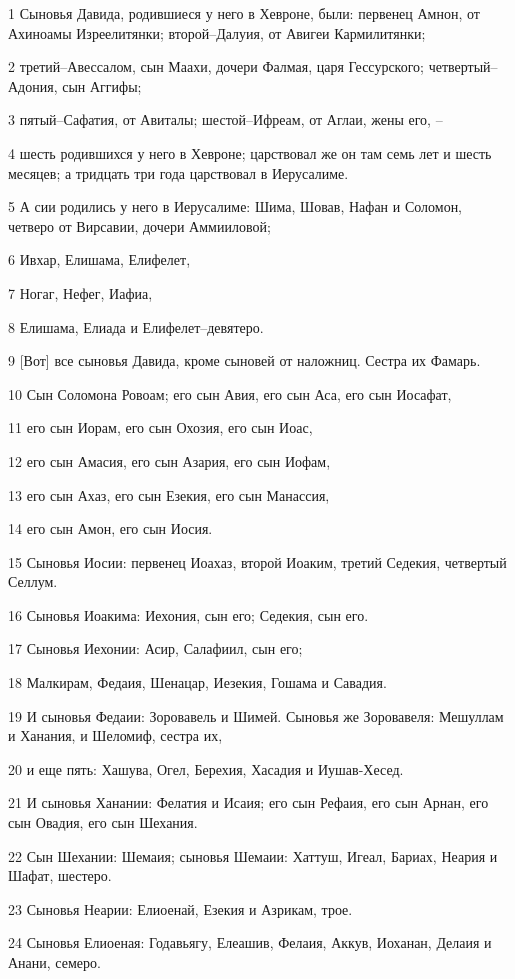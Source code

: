 \par 1 Сыновья Давида, родившиеся у него в Хевроне, были: первенец Амнон, от Ахиноамы Изреелитянки; второй--Далуия, от Авигеи Кармилитянки;
\par 2 третий--Авессалом, сын Маахи, дочери Фалмая, царя Гессурского; четвертый--Адония, сын Аггифы;
\par 3 пятый--Сафатия, от Авиталы; шестой--Ифреам, от Аглаи, жены его, --
\par 4 шесть родившихся у него в Хевроне; царствовал же он там семь лет и шесть месяцев; а тридцать три года царствовал в Иерусалиме.
\par 5 А сии родились у него в Иерусалиме: Шима, Шовав, Нафан и Соломон, четверо от Вирсавии, дочери Аммииловой;
\par 6 Ивхар, Елишама, Елифелет,
\par 7 Ногаг, Нефег, Иафиа,
\par 8 Елишама, Елиада и Елифелет--девятеро.
\par 9 [Вот] все сыновья Давида, кроме сыновей от наложниц. Сестра их Фамарь.
\par 10 Сын Соломона Ровоам; его сын Авия, его сын Аса, его сын Иосафат,
\par 11 его сын Иорам, его сын Охозия, его сын Иоас,
\par 12 его сын Амасия, его сын Азария, его сын Иофам,
\par 13 его сын Ахаз, его сын Езекия, его сын Манассия,
\par 14 его сын Амон, его сын Иосия.
\par 15 Сыновья Иосии: первенец Иоахаз, второй Иоаким, третий Седекия, четвертый Селлум.
\par 16 Сыновья Иоакима: Иехония, сын его; Седекия, сын его.
\par 17 Сыновья Иехонии: Асир, Салафиил, сын его;
\par 18 Малкирам, Федаия, Шенацар, Иезекия, Гошама и Савадия.
\par 19 И сыновья Федаии: Зоровавель и Шимей. Сыновья же Зоровавеля: Мешуллам и Ханания, и Шеломиф, сестра их,
\par 20 и еще пять: Хашува, Огел, Берехия, Хасадия и Иушав-Хесед.
\par 21 И сыновья Ханании: Фелатия и Исаия; его сын Рефаия, его сын Арнан, его сын Овадия, его сын Шехания.
\par 22 Сын Шехании: Шемаия; сыновья Шемаии: Хаттуш, Игеал, Бариах, Неария и Шафат, шестеро.
\par 23 Сыновья Неарии: Елиоенай, Езекия и Азрикам, трое.
\par 24 Сыновья Елиоеная: Годавьягу, Елеашив, Фелаия, Аккув, Иоханан, Делаия и Анани, семеро.

